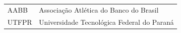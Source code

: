\begin{tabular}{p{2.5cm}p{14.5cm}}
     AABB       & Associação Atlética do Banco do Brasil  \\
     UTFPR      & Universidade Tecnológica Federal do Paraná 
\end{tabular}